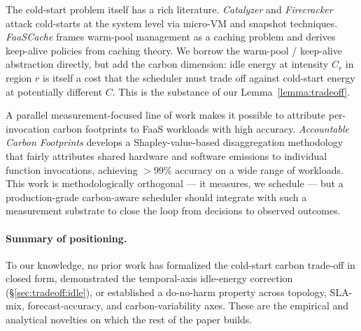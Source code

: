 The cold-start problem itself has a rich literature.
\emph{Catalyzer} \citep{du2020catalyzer} and \emph{Firecracker}
\citep{agache2020firecracker} attack cold-starts at the system level
via micro-VM and snapshot techniques. \emph{FaaSCache}
\citep{fuerst2021faascache} frames warm-pool management as a caching
problem and derives keep-alive policies from caching theory. We
borrow the warm-pool / keep-alive abstraction directly, but add the
carbon dimension: idle energy at intensity $C_r$ in region $r$ is
itself a cost that the scheduler must trade off against cold-start
energy at potentially different $C$. This is the substance of our
Lemma~\ref{lemma:tradeoff}.

A parallel measurement-focused line of work makes it possible to
attribute per-invocation carbon footprints to FaaS workloads with
high accuracy. \emph{Accountable Carbon Footprints}
\citep{sharma2024accountable} develops a Shapley-value-based
disaggregation methodology that fairly attributes shared hardware and
software emissions to individual function invocations, achieving
$>$99\% accuracy on a wide range of workloads. This work is
methodologically orthogonal --- it measures, we schedule --- but a
production-grade carbon-aware scheduler should integrate with such a
measurement substrate to close the loop from decisions to observed
outcomes.

\paragraph{Summary of positioning.} To our knowledge, no prior work
has formalized the cold-start carbon trade-off in closed form,
demonstrated the temporal-axis idle-energy correction
(\S\ref{sec:tradeoff:idle}), or established a do-no-harm property
across topology, SLA-mix, forecast-accuracy, and carbon-variability
axes. These are the empirical and analytical novelties on which the
rest of the paper builds.
